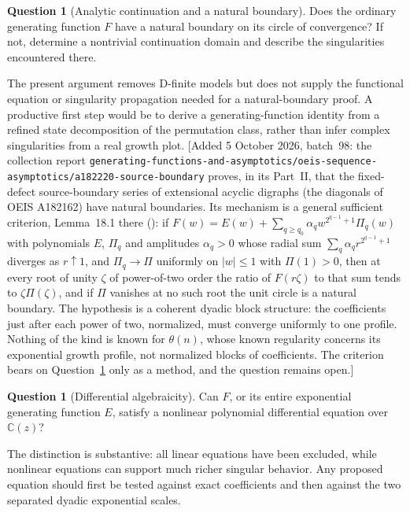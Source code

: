 \documentclass[11pt,a4paper]{article}
\numberwithin{equation}{section}
\theoremstyle{definition}
\newtheorem{question}[theorem]{Question}
\theoremstyle{remark}
\newcommand{\code}[1]{\texttt{\detokenize{#1}}}
\newcommand{\lean}[1]{\nolinkurl{#1}}
\newcommand{\C}{\mathbb C}
\newcommand{\tht}{\theta}
\theoremstyle{definition}
\theoremstyle{plain}
\begin{document}
\begin{question}[Analytic continuation and a natural boundary]
\label{dsr:nh:q:boundary}%
Does the ordinary generating function $F$ have a natural boundary on its
circle of convergence? If not, determine a nontrivial continuation domain
and describe the singularities encountered there.
\end{question}
The present argument removes D-finite models but does not supply the
functional equation or singularity propagation needed for a natural-boundary
proof. A productive first step would be to derive a generating-function
identity from a refined state decomposition of the permutation class,
rather than infer complex singularities from a real growth plot.
[Added 5 October 2026, batch~98: the collection report
\lean{generating-functions-and-asymptotics/oeis-sequence-asymptotics/a182220-source-boundary}
proves, in its Part~II, that the fixed-defect source-boundary series of
extensional acyclic digraphs (the diagonals of OEIS A182162) have natural
boundaries. Its mechanism is a general sufficient criterion, Lemma~18.1
there (\code{sbd:edge:lem:transfer}): if
$F(w)=E(w)+\sum_{q\ge q_0}\alpha_qw^{2^{q-1}+1}\Pi_q(w)$ with polynomials
$E$, $\Pi_q$ and amplitudes $\alpha_q>0$ whose radial sum
$\sum_q\alpha_qr^{2^{q-1}+1}$ diverges as $r\uparrow1$, and
$\Pi_q\to\Pi$ uniformly on $|w|\le1$ with $\Pi(1)>0$, then at every root of
unity $\zeta$ of power-of-two order the ratio of $F(r\zeta)$ to that sum
tends to $\zeta\Pi(\zeta)$, and if $\Pi$ vanishes at no such root the unit
circle is a natural boundary. The hypothesis is a coherent dyadic block
structure: the coefficients just after each power of two, normalized, must
converge uniformly to one profile. Nothing of the kind is known for
$\tht(n)$, whose known regularity concerns its exponential growth profile,
not normalized blocks of coefficients. The criterion bears on
Question~\ref{dsr:nh:q:boundary} only as a method, and the question remains
open.]

\begin{question}[Differential algebraicity]
\label{dsr:nh:q:dalg}%
Can $F$, or its entire exponential generating function $E$, satisfy a
nonlinear polynomial differential equation over $\C(z)$?
\end{question}
The distinction is substantive: all linear equations have been excluded,
while nonlinear equations can support much richer singular behavior. Any
proposed equation should first be tested against exact coefficients and
then against the two separated dyadic exponential scales.
\end{document}
